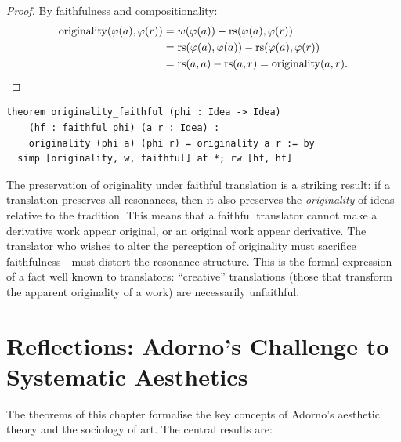 \begin{proof}
By faithfulness and compositionality:
\begin{align*}
  \mathrm{originality}(\varphi(a), \varphi(r))
    &= w(\varphi(a)) - \mathrm{rs}(\varphi(a), \varphi(r)) \\
    &= \mathrm{rs}(\varphi(a), \varphi(a)) - \mathrm{rs}(\varphi(a), \varphi(r)) \\
    &= \mathrm{rs}(a, a) - \mathrm{rs}(a, r)
     = \mathrm{originality}(a, r).
\end{align*}
\end{proof}

\begin{lstlisting}
theorem originality_faithful (phi : Idea -> Idea)
    (hf : faithful phi) (a r : Idea) :
    originality (phi a) (phi r) = originality a r := by
  simp [originality, w, faithful] at *; rw [hf, hf]
\end{lstlisting}

\begin{interpretation}
\label{int:originality-preserve}
The preservation of originality under faithful translation is a striking
result: if a translation preserves all resonances, then it also preserves
the \emph{originality} of ideas relative to the tradition.  This means
that a faithful translator cannot make a derivative work appear original,
or an original work appear derivative.  The translator who wishes to alter
the perception of originality must sacrifice faithfulness---must distort
the resonance structure.  This is the formal expression of a fact well
known to translators: ``creative'' translations (those that transform
the apparent originality of a work) are necessarily unfaithful.
\end{interpretation}

\section{Reflections: Adorno's Challenge to Systematic Aesthetics}

The theorems of this chapter formalise the key concepts of Adorno's
aesthetic theory and the sociology of art.  The central results are:

